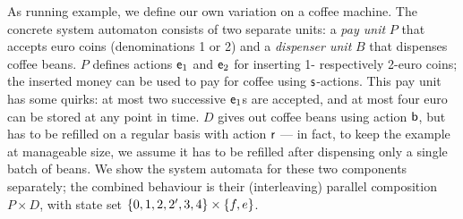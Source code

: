As running example, we define our own variation on a coffee machine. The concrete system automaton consists of two separate units: a \emph{pay unit} $P$ that accepts euro coins (denominations 1 or 2) and a \emph{dispenser unit} $B$ that dispenses coffee beans. $P$ defines actions $\mathsf{e}_1$ and $\mathsf{e}_2$ for inserting 1- respectively 2-euro coins; the inserted money can be used to pay for coffee using $\mathsf{s}$-actions. This pay unit has some quirks: at most two successive $\mathsf{e}_1$s are accepted, and at most four euro can be stored at any point in time. $D$ gives out coffee beans using action $\mathsf{b}$, but has to be refilled on a regular basis with action $\mathsf{r}$ --- in fact, to keep the example at manageable size, we assume it has to be refilled after dispensing only a single batch of beans. We show the system automata for these two components separately; the combined behaviour is their (interleaving) parallel composition $P\times D$, with state set $\{{0,1,2,2',3,4}\}\times \{{f,e}\}$.

\begin{center}
\qquad
{}
\end{center}


